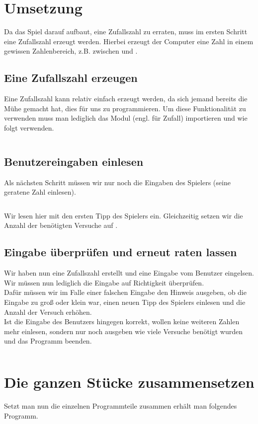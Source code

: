 \documentclass{\VorlagenPfad/coderdojokatext}
\begin{document}
\section{Umsetzung}
Da das Spiel darauf aufbaut, eine Zufallszahl zu erraten, muss im ersten Schritt eine Zufallszahl erzeugt werden. Hierbei erzeugt der Computer eine Zahl in einem gewissen Zahlenbereich, z.B. zwischen  und .

\subsection{Eine Zufallszahl erzeugen}
Eine Zufallszahl kann relativ einfach erzeugt werden, da sich jemand bereits die Mühe gemacht hat, dies für uns zu programmieren. Um diese Funktionalität zu verwenden muss man lediglich das Modul  (engl. für Zufall) importieren und wie folgt verwenden.
\inputminted[firstline=1, lastline=3, linenos]{python}{../Beispiele/zahlen_raten.py}

\subsection{Benutzereingaben einlesen}
Als nächsten Schritt müssen wir nur noch die Eingaben des Spielers (seine geratene Zahl einlesen).

\inputminted[firstline=5, lastline=11, linenos]{python}{../Beispiele/zahlen_raten.py}
Wir lesen hier mit  den ersten Tipp des Spielers ein. Gleichzeitig setzen wir die Anzahl der benötigten Versuche auf .

\subsection{Eingabe überprüfen und erneut raten lassen}
Wir haben nun eine Zufallszahl erstellt und eine Eingabe vom Benutzer eingelsen. Wir müssen nun lediglich die Eingabe auf Richtigkeit überprüfen.
\\Dafür müssen wir im Falle einer falschen Eingabe den Hinweis ausgeben, ob die Eingabe zu groß oder klein war, einen neuen Tipp des Spielers einlesen und die Anzahl der Versuch erhöhen.
\\Ist die Eingabe des Benutzers hingegen korrekt, wollen keine weiteren Zahlen mehr einlesen, sondern nur noch ausgeben wie viele Versuche benötigt wurden und das Programm beenden.
\inputminted[firstline=12, linenos]{python}{../Beispiele/zahlen_raten.py}




\pagebreak
\section{Die ganzen Stücke zusammensetzen}
Setzt man nun die einzelnen Programmteile zusammen erhält man folgendes Programm.

\inputminted[linenos]{python}{../Beispiele/zahlen_raten.py}
\end{document}
